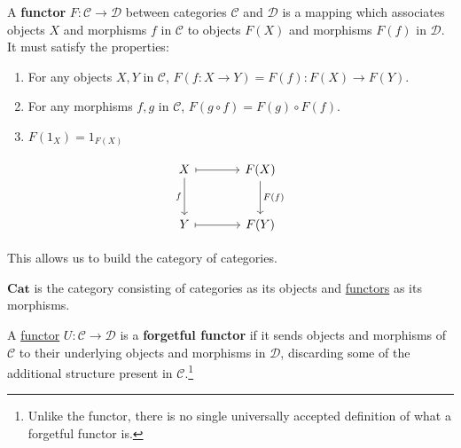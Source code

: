 	\begin{definition}[Functor]
	  \label{def:functor}
		A \textbf{functor} $F: \mathcal{C} \to \mathcal{D}$ between categories $\mathcal{C}$ and $\mathcal{D}$ is a mapping which associates objects $X$ and morphisms $f$ in $\mathcal{C}$ to objects $F(X)$ and morphisms $F(f)$ in $\mathcal{D}$. It must satisfy the properties: 
		\begin{enumerate}
			\item For any objects $X, Y$ in $\mathcal{C}$, $F(f: X \to Y) = F(f): F(X) \to F(Y)$. 
			\item For any morphisms $f, g$ in $\mathcal{C}$, $F(g \circ f) = F(g) \circ F(f)$. 
			\item $F(1_X) = 1_{F(X)}$
		\end{enumerate}

		\begin{equation}
		  \begin{tikzcd}[row sep=large, column sep=large]
		  	X \arrow[r, mapsto] \arrow[d, "f"'] &
		  	F(X) \arrow[d, "F(f)"] \\
		  	Y \arrow[r, mapsto] &
		  	F(Y)
		  \end{tikzcd}
		\end{equation}
	\end{definition}

	This allows us to build the category of categories. 

	\begin{example}
	  \label{ex:cat}
	  $\mathbf{Cat}$ is the category consisting of categories as its objects and \hyperref[def:functor]{functors} as its morphisms. 
	\end{example}

	\begin{definition}
	  \label{def:forgetful-functor}
		A \hyperref[def:functor]{functor} $U: \mathcal{C} \to \mathcal{D}$ is a \textbf{forgetful functor} if it sends objects and morphisms of $\mathcal{C}$ to their underlying objects and morphisms in $\mathcal{D}$, discarding some of the additional structure present in $\mathcal{C}$.\footnote{Unlike the functor, there is no single universally accepted definition of what a forgetful functor is.}
	\end{definition}

